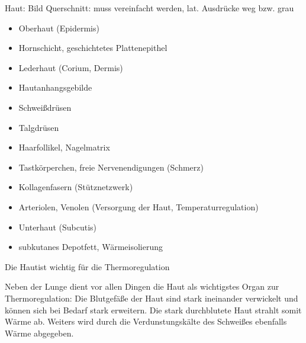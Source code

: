 \documentclass{article}
\begin{document}
Haut: Bild Querschnitt: muss vereinfacht werden, lat. Ausdr\"ucke weg
bzw. grau

\begin{itemize}
\item {}Oberhaut (Epidermis)

\end{itemize}
\begin{itemize}
\item Hornschicht, geschichtetes Plattenepithel

\end{itemize}
\begin{itemize}
\item {}Lederhaut (Corium, Dermis)

\end{itemize}
\begin{itemize}
\item Hautanhangsgebilde

\end{itemize}
\begin{itemize}
\item Schwei{\ss}dr\"usen

\item Talgdr\"usen

\item Haarfollikel, Nagelmatrix

\end{itemize}
\begin{itemize}
\item Tastk\"orperchen, freie Nervenendigungen (Schmerz)

\item Kollagenfasern (St\"utznetzwerk)

\item Arteriolen, Venolen (Versorgung der Haut, Temperaturregulation)

\end{itemize}
\begin{itemize}
\item {}Unterhaut (Subcutis)

\end{itemize}
\begin{itemize}
\item subkutanes Depotfett, W\"armeisolierung

\end{itemize}
Die Hautist wichtig f\"ur die Thermoregulation

Neben der Lunge dient vor allen Dingen  die Haut als wichtigstes Organ
zur Thermoregulation: Die Blutgef\"a{\ss}e  der  Haut sind stark
ineinander verwickelt und k\"onnen sich bei Bedarf stark erweitern. Die
stark durchblutete  Haut strahlt somit W\"arme ab. Weiters wird durch
die Verdunstungsk\"alte  des Schwei{\ss}es  ebenfalls W\"arme
abgegeben. 
\end{document}
